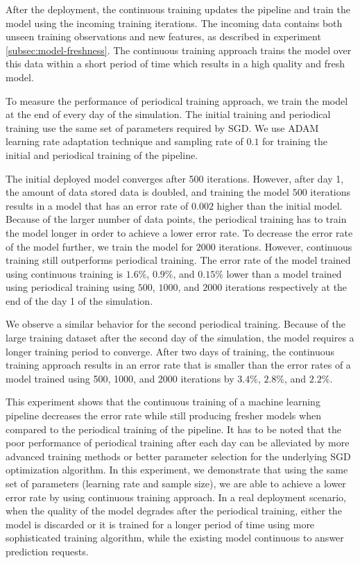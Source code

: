 After the deployment, the continuous training updates the pipeline and train the model using the incoming training iterations.
The incoming data contains both unseen training observations and new features, as described in experiment \ref{subsec:model-freshness}.
The continuous training approach trains the model over this data within a short period of time which results in a high quality and fresh model.

To measure the performance of periodical training approach, we train the model at the end of every day of the simulation.
The initial training and periodical training use the same set of parameters required by SGD.
We use ADAM learning rate adaptation technique and sampling rate of $0.1$ for training the initial and periodical training of the pipeline.

The initial deployed model converges after 500 iterations.
However, after day 1, the amount of data stored data is doubled, and training the model $500$ iterations results in a model that has an error rate of $0.002$ higher than the initial model.
Because of the larger number of data points, the periodical training has to train the model longer in order to achieve a lower error rate.
To decrease the error rate of the model further, we train the model for $2000$ iterations.
However, continuous training still outperforms periodical training.
The error rate of the model trained using continuous training is $1.6\%$, $0.9\%$, and $0.15\% $ lower than a model trained using periodical training using $500$, $1000$, and $2000$ iterations respectively at the end of the day 1 of the simulation.

We observe a similar behavior for the second periodical training.
Because of the large training dataset after the second day of the simulation, the model requires a longer training period to converge.
After two days of training, the continuous training approach results in an error rate that is smaller than the error rates of a model trained using 500, 1000, and 2000 iterations by $3.4\%$, $2.8\%$, and $2.2\%$.

This experiment shows that the continuous training of a machine learning pipeline decreases the error rate while still producing fresher models when compared to the periodical training of the pipeline.
It has to be noted that the poor performance of periodical training after each day can be alleviated by more advanced training methods or better parameter selection for the underlying SGD optimization algorithm.
In this experiment, we demonstrate that using the same set of parameters (learning rate and sample size), we are able to achieve a lower error rate by using continuous training approach.
In a real deployment scenario, when the quality of the model degrades after the periodical training, either the model is discarded or it is trained for a longer period of time using more sophisticated training algorithm, while the existing model continuous to answer prediction requests.



